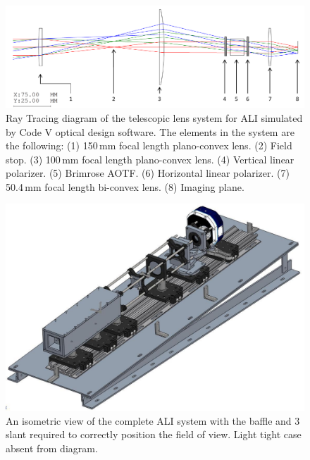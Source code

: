 \documentclass[amtd, online, hvmath]{copernicus}
\begin{document}
\begin{figure}
\includegraphics[width=120mm]{amt-2015-329-discussions-f04.pdf}
\caption{Ray Tracing diagram of the telescopic lens system for ALI
  simulated by Code V optical design software. The elements in the
  system are the following: (1) 150\,\unit{mm} focal length
  plano-convex lens. (2) Field stop.  (3) 100\,\unit{mm} focal length
  plano-convex lens. (4) Vertical linear polarizer.  (5) Brimrose
  AOTF. (6) Horizontal linear polarizer. (7) 50.4\,\unit{mm} focal
  length bi-convex lens. (8) Imaging plane.}
\label{amtd-2015-0329-f04.pdf}
\end{figure}

\begin{figure}
\includegraphics[width=120mm]{amt-2015-329-discussions-f05.pdf}
\caption{An isometric view of the complete ALI system with the baffle
  and 3{\degree} slant required to correctly position the field of
  view. Light tight case absent from diagram.}
\label{amtd-2015-0329-f05.pdf}
\end{figure}
\end{document}

